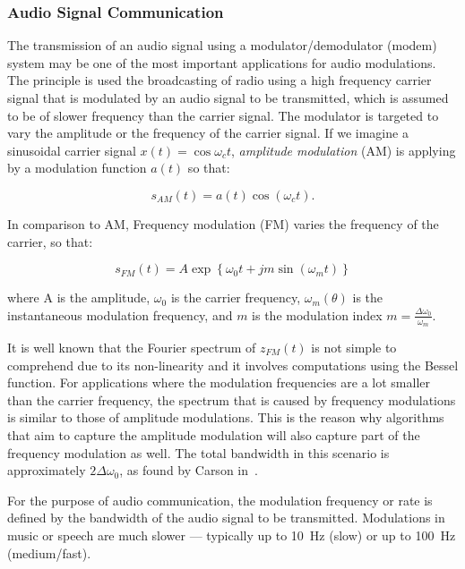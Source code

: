 \subsubsection*{Audio Signal Communication}

The transmission of an audio signal using a modulator/demodulator (modem) system may be one of the most important applications for audio modulations. 
The principle is used the broadcasting of radio using a high frequency carrier signal that is modulated by an audio signal to be transmitted, which is assumed to be of slower frequency than the carrier signal.
The modulator is targeted to vary the amplitude or the frequency of the carrier signal.
If we imagine a sinusoidal carrier signal $x(t) = \cos \omega_c t$, \emph{amplitude modulation} (AM) is applying by a modulation function $a(t)$ so that:

\begin{equation*}
    s_{AM}(t) = a(t) \cos \left( \omega_{c} t\right).    
\end{equation*}

In comparison to AM, Frequency modulation (FM) varies the frequency of the carrier, so that:

\begin{equation*}
    s_{FM}(t) = A \exp \left\{ \omega_ { 0 } t + j m \sin \left( \omega_ { m } t \right) \right\}
\end{equation*}

where A is the amplitude, $\omega_0$ is the carrier frequency, $\omega_m(\theta)$ is the instantaneous modulation frequency, and $m$ is the modulation index $m = \frac{\Delta \omega_0} { \omega_{m} }$.

It is well known that the Fourier spectrum of $z_{FM}(t)$ is not simple to comprehend due to its non-linearity and it involves computations using the Bessel function.
For applications where the modulation frequencies are a lot smaller than the carrier frequency, the spectrum that is caused by frequency modulations is similar to those of amplitude modulations.
This is the reason why algorithms that aim to capture the amplitude modulation will also capture part of the frequency modulation as well.
The total bandwidth in this scenario is approximately $2\Delta \omega_0$, as found by Carson in~\cite{carson22}.\par
For the purpose of audio communication, the modulation frequency or rate is defined by the bandwidth of the audio signal to be transmitted.
Modulations in music or speech are much slower --- typically up to 10~\si{\hertz} (slow) or up to 100~\si{\hertz} (medium/fast).

